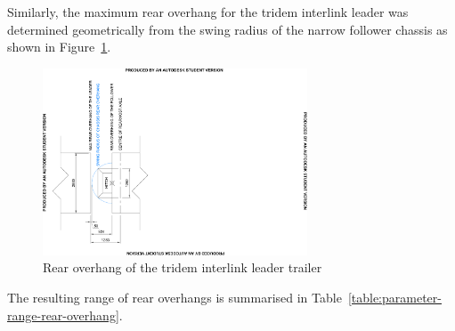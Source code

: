 Similarly, the maximum rear overhang for the tridem interlink leader was determined geometrically from the swing radius of the narrow follower chassis as shown in Figure~\ref{figure:parameter-selection-rear-overhang-of-b-double-leader}.

\begin{figure}[H]
	\centering
	\includegraphics[width=0.7\textwidth]{fig/parameter-selection_rear-overhang_b-double-leader}
	\caption{Rear overhang of the tridem interlink leader trailer}
	\label{figure:parameter-selection-rear-overhang-of-b-double-leader}
\end{figure}

The resulting range of rear overhangs is summarised in Table~\ref{table:parameter-range-rear-overhang}.

